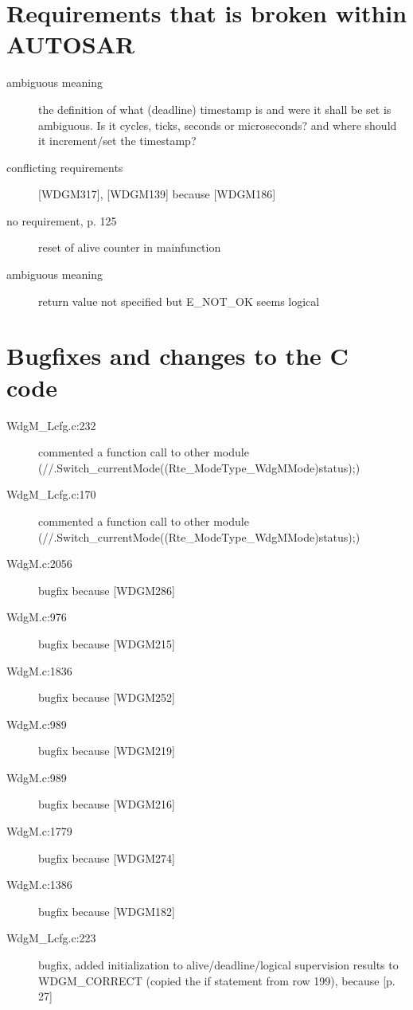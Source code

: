 \documentclass[11pt,a4paper]{article}
\begin{document}
\section{Requirements that is broken within AUTOSAR}
\begin{description}
  \item[ambiguous meaning] the definition of what (deadline) timestamp is and were it shall
    be set is ambiguous. Is it cycles, ticks, seconds or microseconds? and where
    should it increment/set the timestamp?
  \item[conflicting requirements] [WDGM317], [WDGM139] because [WDGM186]
  \item[no requirement, p. 125] reset of alive counter in mainfunction
  \item[ambiguous meaning] return value not specified but E\_NOT\_OK seems logical
\end{description}

\section{Bugfixes and changes to the C code}
\begin{description}
  \item[WdgM\_Lcfg.c:232] \parbox[t]{0.8\linewidth}{commented a function call to other module (//.Switch\_currentMode((Rte\_ModeType\_WdgMMode)status);)}
  \item[WdgM\_Lcfg.c:170] \parbox[t]{0.8\linewidth}{commented a function call to other module
(//.Switch\_currentMode((Rte\_ModeType\_WdgMMode)status);)}
  \item[WdgM.c:2056] bugfix because [WDGM286]
  \item[WdgM.c:976] bugfix because [WDGM215]
  \item[WdgM.c:1836] bugfix because [WDGM252]
  \item[WdgM.c:989] bugfix because [WDGM219]
  \item[WdgM.c:989] bugfix because [WDGM216]
  \item[WdgM.c:1779] bugfix because [WDGM274]
  \item[WdgM.c:1386] bugfix because [WDGM182]
  \item[WdgM\_Lcfg.c:223] \parbox[t]{0.8\linewidth}{bugfix, added initialization
      to alive/deadline/logical supervision results to WDGM\_CORRECT (copied the
      if statement from row 199), because [p. 27]}
\end{description}
\end{document}
